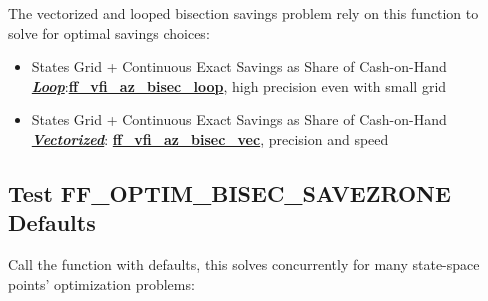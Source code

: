 \documentclass[
]{book}
\begin{document}
The vectorized and looped bisection savings problem rely on this
function to solve for optimal savings choices:

\begin{itemize}
\item
  States Grid + Continuous Exact Savings as Share of Cash-on-Hand
  \underline{\textbf{\emph{Loop}}}:\href{https://github.com/FanWangEcon/MEconTools/blob/master/MEconTools/vfi/ff_vfi_az_bisec_loop.m}{\textbf{ff\_vfi\_az\_bisec\_loop}},
  high precision even with small grid
\item
  States Grid + Continuous Exact Savings as Share of Cash-on-Hand
  \underline{\textbf{\emph{Vectorized}}}:
  \href{https://github.com/FanWangEcon/MEconTools/blob/master/MEconTools/vfi/ff_vfi_az_bisec_vec.m}{\textbf{ff\_vfi\_az\_bisec\_vec}},
  precision and speed
\end{itemize}

\hypertarget{test-ff_optim_bisec_savezrone-defaults}{%
\subsection{Test FF\_OPTIM\_BISEC\_SAVEZRONE Defaults}\label{test-ff_optim_bisec_savezrone-defaults}}

Call the function with defaults, this solves concurrently for many
state-space points' optimization problems:
\end{document}
